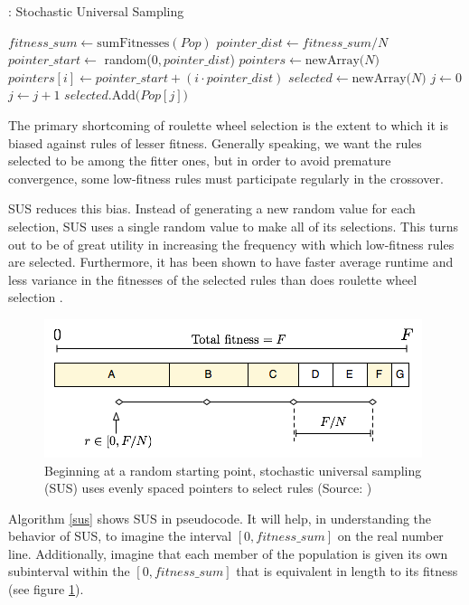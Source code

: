 \documentclass[12pt]{article}
\begin{document}
\begin{algorithm}
\caption{: Stochastic Universal Sampling}
\label{sus}
\begin{algorithmic}
\State $fitness\_sum \gets \text{sumFitnesses}(Pop)$
\State $pointer\_dist \gets fitness\_sum/N$
\State $pointer\_start \gets$ random($0,pointer\_dist$)
\State $pointers \gets \text{newArray($N $)}$
\State $pointers[i] \gets pointer\_start + (i \cdot pointer\_dist)$
\EndFor
\State $selected \gets \text{newArray($N$)}$
\State $j \gets 0$
\State $j \gets j + 1$
\EndWhile
\State $selected.\text{Add($Pop[j]$)}$
\EndFor
\EndFunction
\end{algorithmic}
\end{algorithm}

The primary shortcoming of roulette wheel selection is the extent to which it is biased against rules of lesser fitness. Generally speaking, we want the rules selected to be among the fitter ones, but in order to avoid premature convergence, some low-fitness rules must participate regularly in the crossover.

SUS reduces this bias. Instead of generating a new random value for each selection, SUS uses a single random value to make all of its selections. This turns out to be of great utility in increasing the frequency with which low-fitness rules are selected.
Furthermore, it has been shown to have faster average runtime and less variance in the fitnesses of the selected rules than does roulette wheel selection \cite{tobias_blickle_comparison_1995}.

\begin{figure}[h!]
\centering
\includegraphics[scale=0.6]{images/sus.png}
\caption{Beginning at a random starting point, stochastic universal sampling (SUS) uses evenly spaced pointers to select rules (Source: \cite{assumed_diagram_2007})}
\label{sus_graphic}
\end{figure}

Algorithm \ref{sus} shows SUS in pseudocode. It will help, in understanding the behavior of SUS, to imagine the interval $[0, fitness\_sum]$ on the real number line. Additionally, imagine that each member of the population is given its own subinterval within the $[0, fitness\_sum]$ that is equivalent in length to its fitness (see figure \ref{sus_graphic}).
\end{document}
